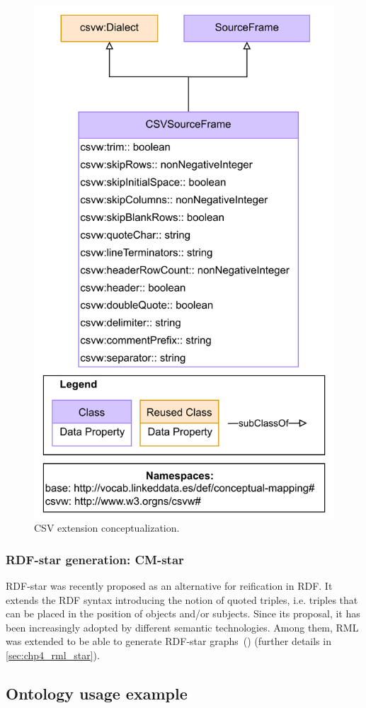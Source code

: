 \begin{figure}[!t]
\centering
\includegraphics[width=0.5\linewidth]{figures/CSV-extension.pdf}
\caption{CSV extension conceptualization.}
\label{fig:csv-ext}
\end{figure}

\subsubsection{RDF-star generation: CM-star}

RDF-star was recently proposed as an alternative for reification in RDF. It extends the RDF syntax introducing the notion of quoted triples, i.e. triples that can be placed in the position of objects and/or subjects. Since its proposal, it has been increasingly adopted by different semantic technologies. Among them, RML was extended to be able to generate RDF-star graphs~(\cite{iglesias2022rmlstar}) (further details in \cref{sec:chp4_rml_star}). 



\subsection{Ontology usage example}\label{sec:cm_example} 



